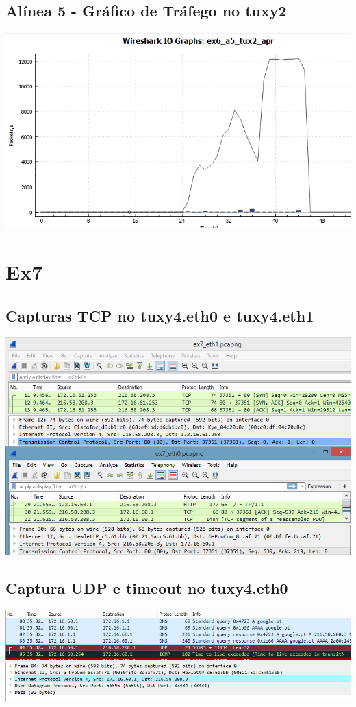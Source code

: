 \documentclass[11pt,a4paper,reqno]{report}
\numberwithin{equation}{section}
\begin{document}
\begin{appendices}
\subsection{Alínea 5 - Gráfico de Tráfego no tuxy2}
\label{ex6_a5_2io}
\includegraphics[width=18cm]{ex6_a5_tux2_IO.png}

\section{Ex7}%

\subsection{Capturas TCP no tuxy4.eth0 e tuxy4.eth1}
\label{ex7_tcp}
\includegraphics[width=18cm]{ex7_TCP.png}
\subsection{Captura UDP e timeout no tuxy4.eth0}
\label{ex7_udp}
\includegraphics[width=18cm]{ex7_udp_timeout.png}

\end{appendices}
\end{document}
